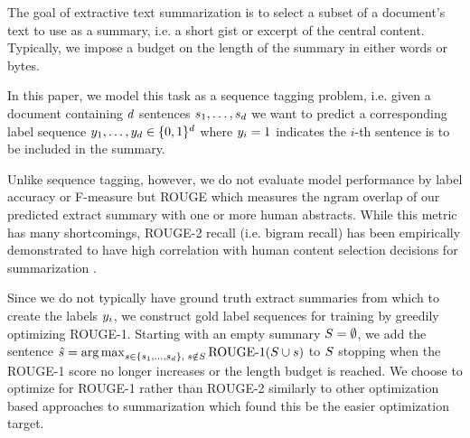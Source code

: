 
The goal of extractive text summarization is to select a subset of a document's
text to use as a summary, i.e. a short gist or excerpt of the central content.
Typically, we impose a budget on the length of the summary in either 
words or bytes.

In this paper, we model this task as a sequence tagging problem, 
i.e. given a document containing $d$ sentences $s_1, \ldots, 
s_{d}$ we want to predict a corresponding label sequence $y_1,
\ldots, y_{d} \in \{0, 1\}^{d}$ where $y_i = 1$ 
indicates the $i$-th sentence is to be included in the summary.

Unlike sequence tagging, however, we do not evaluate model performance 
by label accuracy or F-measure but ROUGE \cite{rouge} which measures the ngram
overlap of our predicted extract summary with one or more human abstracts.
While this metric has many shortcomings, ROUGE-2 recall (i.e. bigram recall)
has been empirically demonstrated to have high correlation with human 
content selection decisions for summarization \cite{ducrouge}.

Since we do not typically have ground truth extract summaries from which to
create the labels $y_i$, we construct gold label sequences for training
by greedily optimizing ROUGE-1. Starting with an empty summary $\summary = 
\null \emptyset$, we add the sentence $\hat{s} = 
{\operatorname*{arg\,max}}_{ s \in \{s_1, \ldots, s_{d}\},
\; s \notin S} \operatorname{ROUGE-1}(S \cup s)$
to $S$ stopping when the ROUGE-1 score no longer increases or the 
length budget is reached. We choose to optimize for ROUGE-1 rather than 
ROUGE-2 similarly to other optimization based approaches to summarization
\cite{durret,joachims,nallapati,maybe_learning_submod_sum} which found this
be the easier optimization target.


